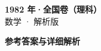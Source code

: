\documentclass[zihao=-4, a4paper]{ctexart}
\begin{document}
\begin{center}
  {\Large\bfseries 1982 年·全国卷（理科）}\\[4pt]
  {\large 数学 · 解析版}
\end{center}
\medskip
{}

\clearpage
{}
\begin{center}{\Large\bfseries 参考答案与详细解析}\end{center}
\medskip

\end{document}
